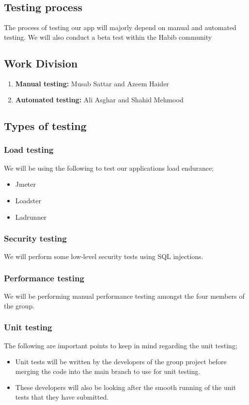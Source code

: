\documentclass[title page]{article}
\begin{document}
\subsection{Testing process}
The process of testing our app will majorly depend on manual and automated testing. We will also conduct a beta test within the Habib community

\subsection{Work Division}
\begin{enumerate}
    \item \textbf{Manual testing:} Musab Sattar and Azeem Haider
    \item\textbf{Automated testing:} Ali Asghar and Shahid Mehmood
\end{enumerate}

\subsection{Types of testing}

\subsubsection{Load testing}
We will be using the following to test our applications load endurance;
\begin{itemize}
    \item Jmeter
    \item Loadster
    \item Ladrunner
\end{itemize}

\subsubsection{Security testing}
We will perform some low-level security tests using SQL injections.
\subsubsection{Performance testing}
We will be performing manual performance testing amongst the four members of the group. 

\subsubsection{Unit testing}
The following are important points to keep in mind regarding the unit testing;
\begin{itemize}
    \item Unit tests will be written by the developers of the group project before merging the code into the main branch to use for unit testing.
    \item These developers will also be looking after the smooth running of the unit tests that they have submitted.
\end{itemize}
\end{document}
